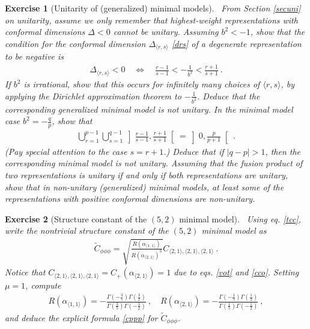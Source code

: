 \documentclass[12pt, a4paper, notitlepage, twoside]{report}
\numberwithin{equation}{section}
\theoremstyle{break}
\newtheorem{exo}{Exercise}[chapter]
\begin{document}
\begin{exo}[Unitarity of (generalized) minimal models]
 ~\label{exoneg}
From Section \ref{secuni} on unitarity, assume we only remember that highest-weight representations with conformal dimensions $\Delta <0$ cannot be unitary. 
Assuming $b^2 < -1$, show that the condition for the conformal dimension $\Delta_{\langle r,s \rangle}$ \eqref{drs} of a degenerate representation to be negative is 
\begin{align}
 \Delta_{\langle r,s \rangle} < 0 \quad \Leftrightarrow \quad \frac{r-1}{s-1} < -\frac{1}{b^2} < \frac{r+1}{s+1} \ .
\end{align}
If $b^2$ is irrational, show that this occurs for infinitely many choices of $\langle r,s \rangle$, by applying the Dirichlet approximation theorem to $-\frac{1}{b^2}$. 
Deduce that the corresponding generalized minimal model is not unitary. 
In the minimal model case $b^2 = -\frac{q}{p}$, show that 
\begin{align}
 \bigcup_{r=1}^{p-1}\bigcup_{s=1}^{q-1} \left] \frac{r-1}{s-1} , \frac{r+1}{s+1} \right[  = \left]0, \frac{p}{p+1}\right[ \ .
\end{align}
(Pay special attention to the case $s=r+1$.) Deduce that if $|q-p|>1$, then the corresponding minimal model is not unitary.
Assuming that the fusion product of two representations is unitary if and only if both representations are unitary, show that in non-unitary (generalized) minimal models, at least some of the representations with positive conformal dimensions are non-unitary.
\end{exo}

\begin{exo}[Structure constant of the $(5,2)$ minimal model]
 ~\label{exocppp}
Using eq. \eqref{tcc}, write the nontrivial structure constant of the $(5,2)$ minimal model as 
\begin{align}
 \tilde{C}_{\phi\phi\phi} = \sqrt{\frac{R(\alpha_{\langle 1,1 \rangle})}{R(\alpha_{\langle 2,1 \rangle})^3}} C_{\langle 2,1\rangle , \langle 2,1 \rangle,\langle 2,1 \rangle}\ .
\end{align}
Notice that $C_{\langle 2,1\rangle , \langle 2,1 \rangle,\langle 2,1 \rangle} = C_+(\alpha_{\langle 2,1 \rangle})=1$ due to eqs. \eqref{vot} and \eqref{cco}.
Setting $\mu=1$, compute
\begin{align}
 R(\alpha_{\langle 1,1 \rangle}) = -\frac{\Gamma(-\frac35)\Gamma(\frac32)}{\Gamma(\frac35)\Gamma(-\frac32)} \ , \quad R(\alpha_{\langle 2,1 \rangle}) = -\frac{\Gamma(-\frac15)\Gamma(\frac12)}{\Gamma(\frac15)\Gamma(-\frac12)}\ , 
\end{align}
and deduce the explicit formula \eqref{cppp} for $\tilde{C}_{\phi\phi\phi}$.
\end{exo}
\end{document}
